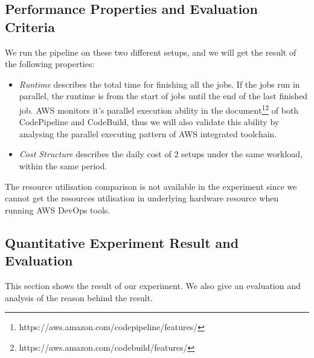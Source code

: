 \subsection{Performance Properties and Evaluation Criteria}
We run the pipeline on these two different setups, and we will get the result of the following properties:
\begin{itemize}
\item \textit{Runtime} describes the total time for finishing all the jobs. If the jobs run in parallel, the runtime is from the start of jobs until the end of the last finished job. AWS monitors it's parallel execution ability in the document\footnote{https://aws.amazon.com/codepipeline/features/}\footnote{https://aws.amazon.com/codebuild/features/} of both CodePipeline and CodeBuild, thus we will also validate this ability by analysing the parallel executing pattern of AWS integrated toolchain. \label{aws_parallel}
\item \textit{Cost Structure} describes the daily cost of 2 setups under the same workload, within the same period.
\end{itemize}
The resource utilisation comparison is not available in the experiment since we cannot get the resources utilisation in underlying hardware resource when running AWS DevOps tools.
\subsection{Quantitative Experiment Result and Evaluation}
This section shows the result of our experiment. We also give an evaluation and analysis of the reason behind the result.

